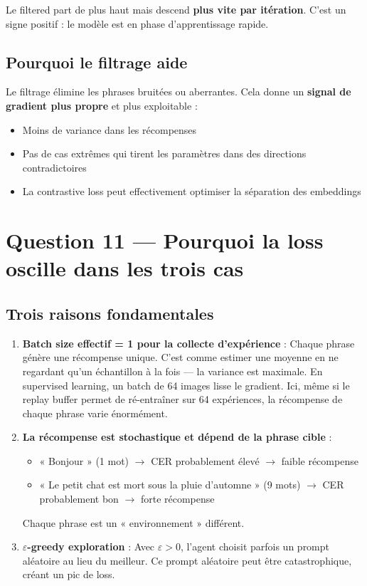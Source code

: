 \documentclass[11pt,a4paper]{article}
\begin{document}
Le filtered part de plus haut mais descend \textbf{plus vite par itération}. C'est un signe positif : le modèle est en phase d'apprentissage rapide.

\subsection{Pourquoi le filtrage aide}

Le filtrage élimine les phrases bruitées ou aberrantes. Cela donne un \textbf{signal de gradient plus propre} et plus exploitable :
\begin{itemize}
    \item Moins de variance dans les récompenses
    \item Pas de cas extrêmes qui tirent les paramètres dans des directions contradictoires
    \item La contrastive loss peut effectivement optimiser la séparation des embeddings
\end{itemize}

\section{Question 11 — Pourquoi la loss oscille dans les trois cas}

\subsection{Trois raisons fondamentales}

\begin{enumerate}
    \item \textbf{Batch size effectif = 1 pour la collecte d'expérience} : Chaque phrase génère une récompense unique. C'est comme estimer une moyenne en ne regardant qu'un échantillon à la fois — la variance est maximale. En supervised learning, un batch de 64 images lisse le gradient. Ici, même si le replay buffer permet de ré-entraîner sur 64 expériences, la récompense de chaque phrase varie énormément.
    
    \item \textbf{La récompense est stochastique et dépend de la phrase cible} : 
    \begin{itemize}
        \item « Bonjour » (1 mot) $\rightarrow$ CER probablement élevé $\rightarrow$ faible récompense
        \item « Le petit chat est mort sous la pluie d'automne » (9 mots) $\rightarrow$ CER probablement bon $\rightarrow$ forte récompense
    \end{itemize}
    Chaque phrase est un « environnement » différent.
    
    \item \textbf{$\varepsilon$-greedy exploration} : Avec $\varepsilon > 0$, l'agent choisit parfois un prompt aléatoire au lieu du meilleur. Ce prompt aléatoire peut être catastrophique, créant un pic de loss.
\end{enumerate}
\end{document}
